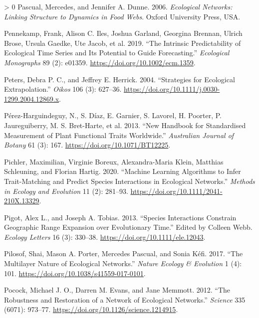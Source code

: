 \documentclass[11pt]{article}
\newlength{\cslhangindent}
\newenvironment{CSLReferences}[3] %
 {%
  \setlength{\parindent}{0pt}
  \ifodd #1 \everypar{\setlength{\hangindent}{\cslhangindent}}\ignorespaces\fi
  \ifnum #2 > 0
  \setlength{\parskip}{#2\baselineskip}
  \fi
 }%
 {}
\begin{document}
\begin{CSLReferences}{1}{0}
\leavevmode\hypertarget{ref-Pascual2006EcoNet}{}%
Pascual, Mercedes, and Jennifer A. Dunne. 2006. \emph{Ecological
Networks: Linking Structure to Dynamics in Food Webs}. Oxford University
Press, USA.

\leavevmode\hypertarget{ref-Pennekamp2019IntPre}{}%
Pennekamp, Frank, Alison C. Iles, Joshua Garland, Georgina Brennan,
Ulrich Brose, Ursula Gaedke, Ute Jacob, et al. 2019. {``The Intrinsic
Predictability of Ecological Time Series and Its Potential to Guide
Forecasting.''} \emph{Ecological Monographs} 89 (2): e01359.
\url{https://doi.org/10.1002/ecm.1359}.

\leavevmode\hypertarget{ref-Peters2004StrEco}{}%
Peters, Debra P. C., and Jeffrey E. Herrick. 2004. {``Strategies for
Ecological Extrapolation.''} \emph{Oikos} 106 (3): 627--36.
\url{https://doi.org/10.1111/j.0030-1299.2004.12869.x}.

\leavevmode\hypertarget{ref-Perez-Harguindeguy2013NewHan}{}%
Pérez-Harguindeguy, N., S. Díaz, E. Garnier, S. Lavorel, H. Poorter, P.
Jaureguiberry, M. S. Bret-Harte, et al. 2013. {``New Handbook for
Standardised Measurement of Plant Functional Traits Worldwide.''}
\emph{Australian Journal of Botany} 61 (3): 167.
\url{https://doi.org/10.1071/BT12225}.

\leavevmode\hypertarget{ref-Pichler2020MacLea}{}%
Pichler, Maximilian, Virginie Boreux, Alexandra-Maria Klein, Matthias
Schleuning, and Florian Hartig. 2020. {``Machine Learning Algorithms to
Infer Trait-Matching and Predict Species Interactions in Ecological
Networks.''} \emph{Methods in Ecology and Evolution} 11 (2): 281--93.
\url{https://doi.org/10.1111/2041-210X.13329}.

\leavevmode\hypertarget{ref-Pigot2013SpeInt}{}%
Pigot, Alex L., and Joseph A. Tobias. 2013. {``Species Interactions
Constrain Geographic Range Expansion over Evolutionary Time.''} Edited
by Colleen Webb. \emph{Ecology Letters} 16 (3): 330--38.
\url{https://doi.org/10.1111/ele.12043}.

\leavevmode\hypertarget{ref-Pilosof2017MulNat}{}%
Pilosof, Shai, Mason A. Porter, Mercedes Pascual, and Sonia Kéfi. 2017.
{``The Multilayer Nature of Ecological Networks.''} \emph{Nature Ecology
\& Evolution} 1 (4): 101. \url{https://doi.org/10.1038/s41559-017-0101}.

\leavevmode\hypertarget{ref-Pocock2012RobRes}{}%
Pocock, Michael J. O., Darren M. Evans, and Jane Memmott. 2012. {``The
Robustness and Restoration of a Network of Ecological Networks.''}
\emph{Science} 335 (6071): 973--77.
\url{https://doi.org/10.1126/science.1214915}.


\end{CSLReferences}
\end{document}
